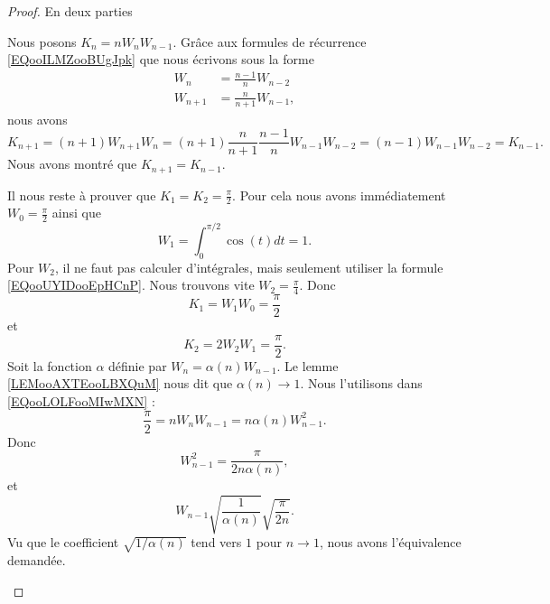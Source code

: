 \begin{proof}
	En deux parties
	\begin{subproof}
		Nous posons \( K_n=nW_nW_{n-1}\). Grâce aux formules de récurrence \eqref{EQooILMZooBUgJpk} que nous écrivons sous la forme
		\begin{subequations}
			\begin{align}
				W_n     & =\frac{ n-1 }{ n }W_{n-2}  \\
				W_{n+1} & =\frac{ n }{ n+1 }W_{n-1},
			\end{align}
		\end{subequations}
		nous avons
		\begin{equation}
			K_{n+1}=(n+1)W_{n+1}W_n=(n+1)\frac{ n }{ n+1 }\frac{ n-1 }{ n }W_{n-1}W_{n-2}=(n-1)W_{n-1}W_{n-2}=K_{n-1}.
		\end{equation}
		Nous avons montré que \( K_{n+1}=K_{n-1}\).

		Il nous reste à prouver que \( K_1=K_2=\frac{ \pi }{2}\). Pour cela nous avons immédiatement \( W_0=\frac{ \pi }{2}\) ainsi que
		\begin{equation}
			W_1=\int_0^{\pi/2}\cos(t)dt=1.
		\end{equation}
		Pour \( W_2\), il ne faut pas calculer d'intégrales, mais seulement utiliser la formule \eqref{EQooUYIDooEpHCnP}. Nous trouvons vite \( W_2=\frac{ \pi }{ 4 }\). Donc
		\begin{equation}
			K_1=W_1W_0=\frac{ \pi }{2}
		\end{equation}
		et
		\begin{equation}
			K_2=2W_2W_1=\frac{ \pi }{2}.
		\end{equation}
		Soit la fonction \( \alpha\)  définie par \( W_n=\alpha(n)W_{n-1}\). Le lemme \ref{LEMooAXTEooLBXQuM} nous dit que \( \alpha(n)\to 1\). Nous l'utilisons dans \eqref{EQooLOLFooMIwMXN} :
		\begin{equation}
			\frac{ \pi }{2}=nW_nW_{n-1}=n\alpha(n)W_{n-1}^2.
		\end{equation}
		Donc
		\begin{equation}
			W_{n-1}^2=\frac{ \pi }{ 2n\alpha(n) },
		\end{equation}
		et
		\begin{equation}
			W_{n-1}\sqrt{ \frac{1}{ \alpha(n) } }\sqrt{ \frac{ \pi }{ 2n } }.
		\end{equation}
		Vu que le coefficient \( \sqrt{ 1/\alpha(n) }\) tend vers \( 1\) pour \( n\to 1\), nous avons l'équivalence demandée.
	\end{subproof}
\end{proof}

